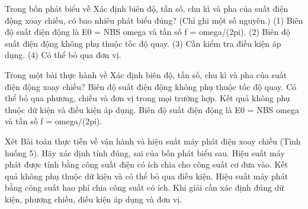 \begin{ex}
Trong bốn phát biểu về Xác định biên độ, tần số, chu kì và pha của suất điện động xoay chiều, có bao nhiêu phát biểu đúng? (Chỉ ghi một số nguyên.) (1) Biên độ suất điện động là E0 = NBS omega và tần số f = omega/(2pi). (2) Biên độ suất điện động không phụ thuộc tốc độ quay. (3) Cần kiểm tra điều kiện áp dụng. (4) Có thể bỏ qua đơn vị.
\end{ex}

\begin{ex}
Trong một bài thực hành về Xác định biên độ, tần số, chu kì và pha của suất điện động xoay chiều?
\choice
{Biên độ suất điện động không phụ thuộc tốc độ quay.}
{Có thể bỏ qua phương, chiều và đơn vị trong mọi trường hợp.}
{Kết quả không phụ thuộc dữ kiện và điều kiện áp dụng.}
{\True Biên độ suất điện động là E0 = NBS omega và tần số f = omega/(2pi).}
\end{ex}

\begin{ex}
Xét Bài toán thực tiễn về vận hành và hiệu suất máy phát điện xoay chiều (Tình huống 5). Hãy xác định tính đúng, sai của bốn phát biểu sau.
\choiceTF
{\True Hiệu suất máy phát được tính bằng công suất điện có ích chia cho công suất cơ đưa vào.}
{Kết quả không phụ thuộc dữ kiện và có thể bỏ qua điều kiện.}
{Hiệu suất máy phát bằng công suất hao phí chia công suất có ích.}
{\True Khi giải cần xác định đúng dữ kiện, phương chiều, điều kiện áp dụng và đơn vị.}
\end{ex}

